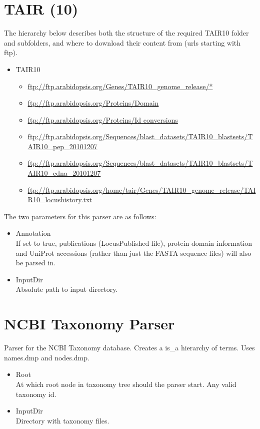 \section{TAIR (10)}

The hierarchy below describes both the structure of the required TAIR10 folder and subfolders, 
and where to download their content from (urls starting with ftp).

\begin{itemize}
\item{TAIR10}
	\begin{itemize}
	\item {\url{ftp://ftp.arabidopsis.org/Genes/TAIR10_genome_release/*}}
	\item {\url{ftp://ftp.arabidopsis.org/Proteins/Domain}}
	\item {\url{ftp://ftp.arabidopsis.org/Proteins/Id conversions}}
	\item {\url{ftp://ftp.arabidopsis.org/Sequences/blast_datasets/TAIR10_blastsets/TAIR10_pep_20101207}}
	\item {\url{ftp://ftp.arabidopsis.org/Sequences/blast_datasets/TAIR10_blastsets/TAIR10_cdna_20101207}}
	\item {\url{ftp://ftp.arabidopsis.org/home/tair/Genes/TAIR10_genome_release/TAIR10_locushistory.txt}} 
	\end{itemize}
\end{itemize}
The two parameters for this parser are as follows:
\begin{itemize}
  \item{Annotation}\\
  If set to true, publications (LocusPublished file), protein domain information 
  and UniProt accessions (rather than just the FASTA sequence files) will also be parsed in.
  \item{InputDir}\\
  Absolute path to input directory. 
\end{itemize}
    
\section{NCBI Taxonomy Parser}
Parser for the NCBI Taxonomy database. Creates a is\_a hierarchy of terms. Uses names.dmp and nodes.dmp.
\begin{itemize}
  \item{Root}\\
  At which root node in taxonomy tree should the parser start. Any valid taxonomy id.
  \item{InputDir}\\
  Directory with taxonomy files. 
\end{itemize}
    
